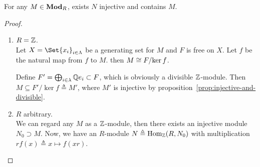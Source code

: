 \begin{theorem} \label{thm:every-module-is-in-injective-module}
 For any $M \in \mathbf{Mod}_R$, exists $N$ injective and contains $M$.
 \begin{proof} $ $
   \begin{enumerate}[label={\bf Case \arabic*:}]
      \item $R = \mathbb{Z}$. \\
        Let $X = \Set{x_i}_{i \in \Lambda}$ be a generating set for $M$
        and $F$ is free on $X$. Let $f$ be the natural map from $f$
        to $M$. then $M \cong {F}/{\ker f}$.

        Define $F' = \bigoplus_{i \in \lambda} \mathbb{Q} e_i \subset F$,
        which is obviously a divisible $\mathbb{Z}$-module.
        Then $M \subseteq F' / \ker f \triangleq M'$,
        where $M'$ is injective by proposition~\ref{prop:injective-and-divisible}.

      \item $R$ arbitrary. \\
        We can regard any $M$ as a $\mathbb{Z}$-module, then there exists an injective
        module $N_0 \supset M$.
        Now, we have an $R$-module $N \triangleq \operatorname{Hom}_{\mathbb{Z}}(R, N_0)$
        with multiplication $r f(x) \triangleq x \mapsto f(x r)$.


\end{enumerate}
\end{proof}
\end{theorem}
